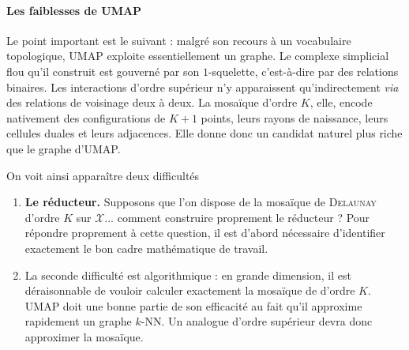 \paragraph{Les faiblesses de UMAP}
Le point important est le suivant : malgré son recours à un vocabulaire topologique, UMAP exploite essentiellement un graphe. Le complexe simplicial flou qu'il construit est gouverné par son $1$-squelette, c'est-à-dire par des relations binaires. Les interactions d'ordre supérieur n'y apparaissent qu'indirectement \emph{via} des relations de voisinage deux à deux. La mosaïque d'ordre $K$, elle, encode nativement des configurations de $K+1$ points, leurs rayons de naissance, leurs cellules duales et leurs adjacences. Elle donne donc un candidat naturel plus riche que le graphe d'UMAP.


On voit ainsi apparaître deux difficultés
\begin{enumerate}
    \item \textbf{Le réducteur.} Supposons que l'on dispose de la mosaïque de \textsc{Delaunay} d'ordre $K$ sur $\mathcal X$... comment construire proprement le réducteur ? Pour répondre proprement à cette question, il est d'abord nécessaire d'identifier exactement le bon cadre mathématique de travail.
    \item La seconde difficulté est algorithmique : en grande dimension, il est déraisonnable de vouloir calculer exactement la mosaïque de  d'ordre $K$. UMAP doit une bonne partie de son efficacité au fait qu'il approxime rapidement un graphe $k$-NN.
    Un analogue d'ordre supérieur devra donc approximer la mosaïque. 
\end{enumerate}





